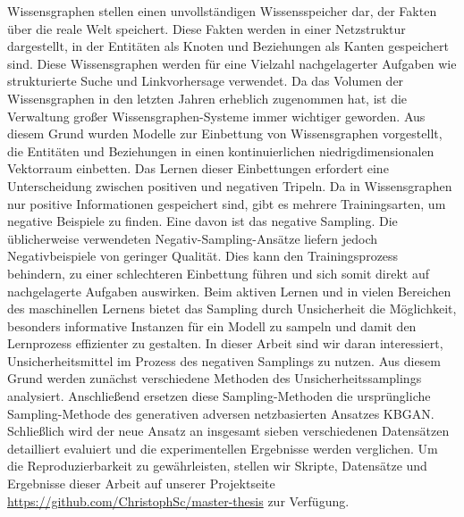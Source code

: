 Wissensgraphen stellen einen unvollständigen Wissensspeicher dar, der Fakten über die reale Welt speichert.
Diese Fakten werden in einer Netzstruktur dargestellt, in der Entitäten als Knoten und Beziehungen als Kanten gespeichert sind.
Diese Wissensgraphen werden für eine Vielzahl nachgelagerter Aufgaben wie strukturierte Suche und Linkvorhersage verwendet.
Da das Volumen der Wissensgraphen in den letzten Jahren erheblich zugenommen hat, ist die Verwaltung großer Wissensgraphen-Systeme immer wichtiger geworden.
Aus diesem Grund wurden Modelle zur Einbettung von Wissensgraphen vorgestellt, die Entitäten und Beziehungen in einen kontinuierlichen niedrigdimensionalen Vektorraum einbetten.
Das Lernen dieser Einbettungen erfordert eine Unterscheidung zwischen positiven und negativen Tripeln.
Da in Wissensgraphen nur positive Informationen gespeichert sind, gibt es mehrere Trainingsarten, um negative Beispiele zu finden.
Eine davon ist das negative Sampling. 
Die üblicherweise verwendeten Negativ-Sampling-Ansätze liefern jedoch Negativbeispiele von geringer Qualität.
Dies kann den Trainingsprozess behindern, zu einer schlechteren Einbettung führen und sich somit direkt auf nachgelagerte Aufgaben auswirken.
Beim aktiven Lernen und in vielen Bereichen des maschinellen Lernens bietet das Sampling durch Unsicherheit die Möglichkeit, besonders informative Instanzen für ein Modell zu sampeln und damit den Lernprozess effizienter zu gestalten.
In dieser Arbeit sind wir daran interessiert, Unsicherheitsmittel im Prozess des negativen Samplings zu nutzen.
Aus diesem Grund werden zunächst verschiedene Methoden des Unsicherheitssamplings analysiert.
Anschließend ersetzen diese Sampling-Methoden die ursprüngliche Sampling-Methode des generativen adversen netzbasierten Ansatzes KBGAN. 
Schließlich wird der neue Ansatz an insgesamt sieben verschiedenen Datensätzen detailliert evaluiert und die experimentellen Ergebnisse werden verglichen.
Um die Reproduzierbarkeit zu gewährleisten, stellen wir Skripte, Datensätze und Ergebnisse dieser Arbeit auf unserer Projektseite \url{https://github.com/ChristophSc/master-thesis} zur Verfügung.